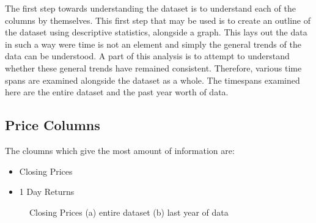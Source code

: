 The first step towards understanding the dataset is to understand each of the columns by themselves. This first step that may be used is to create an outline of the dataset using descriptive statistics, alongside a graph. This lays out the data in such a way were time is not an element and simply the general trends of the data can be understood. A part of this analysis is to attempt to understand whether these general trends have remained consistent. Therefore, various time spans are examined alongside the dataset as a whole. The timespans examined here are the entire dataset and the past year worth of data.

\subsection{Price Columns}

The cloumns which give the most amount of information are:
\begin{itemize}
    \item Closing Prices
    \item 1 Day Returns
\end{itemize}

\begin{figure}[h!]
    \centering
    \caption{Closing Prices (a) entire dataset (b) last year of data}
    \label{fig:closeDesc}
\end{figure}

